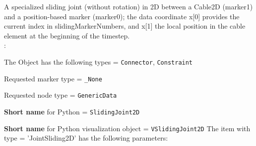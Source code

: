 %
\newpage


\label{sec:item:ObjectJointSliding2D}
A specialized sliding joint (without rotation) in 2D between a Cable2D (marker1) and a position-based marker (marker0); the data coordinate x[0] provides the current index in slidingMarkerNumbers, and x[1] the local position in the cable element at the beginning of the timestep.
\vspace{12pt}\\

\noindent {}:
\bi
  \item The Object has the following types = \texttt{Connector}, \texttt{Constraint}
  \item Requested marker type = \texttt{\_None}
  \item Requested node type = \texttt{GenericData}
  \item {\bf Short name} for Python = \texttt{SlidingJoint2D}
  \item {\bf Short name} for Python visualization object = \texttt{VSlidingJoint2D}
\ei\vspace{12pt} \noindent 
The item  with type = 'JointSliding2D' has the following parameters:
\vspace{-0.5cm}\\
\vspace{-0.5cm}\\
